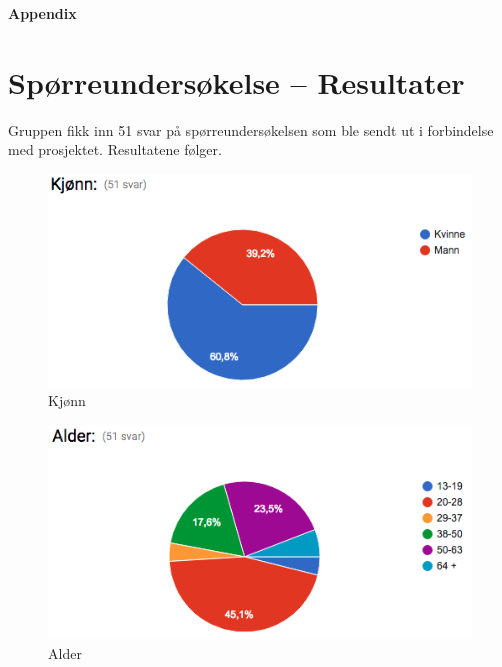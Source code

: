 \begin{center}
\vspace*{5.5cm}
\huge{\textbf{\textcolor[HTML]{D32F2F}{Appendix}}}
\end{center}
\newpage 

\appendix
\section{\textcolor[HTML]{D32F2F}{Spørreundersøkelse – Resultater}} \label{App:AppendixA}

Gruppen fikk inn 51 svar på spørreundersøkelsen som ble sendt ut i forbindelse med prosjektet. Resultatene følger.

\begin{figure}[H]
\includegraphics[scale=0.6]{images/sporreundersokelse/kjonn}
\centering %
\caption{Kjønn}
\label{fig:kjonn}
\end{figure}

\begin{figure}[H]
\includegraphics[scale=0.6]{images/sporreundersokelse/alder}
\centering %
\caption{Alder}
\label{fig:alder}
\end{figure}

